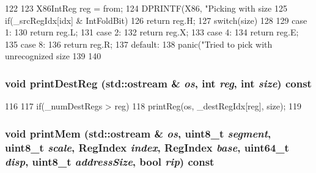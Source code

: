 \begin{DoxyCode}
122         {
123             X86IntReg reg = from;
124             DPRINTF(X86, "Picking with size %
125             if(_srcRegIdx[idx] & IntFoldBit)
126                 return reg.H;
127             switch(size)
128             {
129               case 1:
130                 return reg.L;
131               case 2:
132                 return reg.X;
133               case 4:
134                 return reg.E;
135               case 8:
136                 return reg.R;
137               default:
138                 panic("Tried to pick with unrecognized size %
139             }
140         }
\end{DoxyCode}
\hypertarget{classX86ISA_1_1X86StaticInst_ac7fb2d56c35ab7ecd81be0e2838d860b}{
\subsubsection[{printDestReg}]{\setlength{\rightskip}{0pt plus 5cm}void printDestReg (std::ostream \& {\em os}, \/  int {\em reg}, \/  int {\em size}) const}}
\label{classX86ISA_1_1X86StaticInst_ac7fb2d56c35ab7ecd81be0e2838d860b}



\begin{DoxyCode}
116     {
117         if(_numDestRegs > reg)
118             printReg(os, _destRegIdx[reg], size);
119     }
\end{DoxyCode}
\hypertarget{classX86ISA_1_1X86StaticInst_ae9a7538eaca0077092eb5a0c2f811770}{
\subsubsection[{printMem}]{\setlength{\rightskip}{0pt plus 5cm}void printMem (std::ostream \& {\em os}, \/  uint8\_\-t {\em segment}, \/  uint8\_\-t {\em scale}, \/  {\bf RegIndex} {\em index}, \/  {\bf RegIndex} {\em base}, \/  uint64\_\-t {\em disp}, \/  uint8\_\-t {\em addressSize}, \/  bool {\em rip}) const}}
\label{classX86ISA_1_1X86StaticInst_ae9a7538eaca0077092eb5a0c2f811770}



